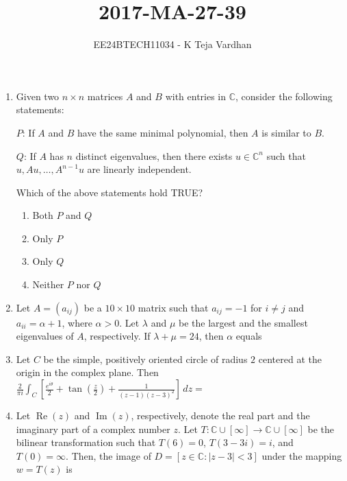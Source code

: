 \documentclass{article}
\newcommand{\brak}[1]{\left( #1 \right)}
\newcommand{\sbrak}[1]{\left[ #1 \right]}
\newcommand{\abs}[1]{\left| #1 \right|}
\begin{document}

\title{2017-MA-27-39}
\author{EE24BTECH11034 - K Teja Vardhan}
{\let\newpage\relax\maketitle}

\begin{enumerate}

\item Given two $n \times n$ matrices $A$ and $B$ with entries in $\mathbb{C}$, consider the following statements:

$P$: If $A$ and $B$ have the same minimal polynomial, then $A$ is similar to $B$.

$Q$: If $A$ has $n$ distinct eigenvalues, then there exists $u \in \mathbb{C}^n$ such that  
 $u, A u, \ldots, A^{n-1} u$ are linearly independent.

Which of the above statements hold TRUE?

\begin{enumerate}
    \item Both $P$ and $Q$
    \item Only $P$
    \item Only $Q$
    \item Neither $P$ nor $Q$
\end{enumerate}

\item Let $A = \brak{a_{ij}}$ be a $10 \times 10$ matrix such that $a_{ij} = -1$ for $i \neq j$ and $a_{ii} = \alpha + 1$, where $\alpha > 0$. Let $\lambda$ and $\mu$ be the largest and  
 the smallest eigenvalues of $A$, respectively. If $\lambda + \mu = 24$, then $\alpha$ equals  

\item Let $C$ be the simple, positively oriented circle of radius $2$ centered at the origin in the complex plane. Then
$\frac{2}{\pi i}\int_{C} \sbrak{\frac{e^{i \theta}}{2} + \tan \brak{\frac{z}{2}} + \frac{1}{\brak{z - 1} \brak{z - 3}^2}} \, dz = $

\item Let $\operatorname{Re} \brak{z}$ and $\operatorname{Im} \brak{z}$, respectively, denote the real part and the imaginary part of a complex number $z$. Let $T: \mathbb{C} \cup \sbrak{\infty}  
 \to \mathbb{C} \cup \sbrak{\infty}$ be the bilinear transformation such that $T \brak{6} = 0$, $T \brak{3 - 3 i} = i$, and $T \brak{0} = \infty$. Then, the image of $D = \sbrak{z \in \mathbb{C} : \abs{z - 3} < 3}$ under the mapping $w = T \brak{z}$ is


\end{enumerate}
\end{document}

